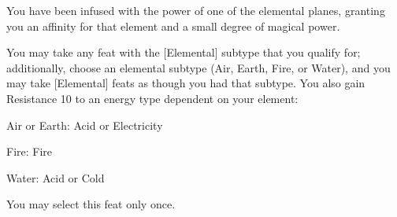 \shortfeat
{You have been infused with the power of one of the elemental planes, granting you an affinity for that element and a small degree of magical power.}
{You may take any feat with the [Elemental] subtype that you qualify for; additionally, choose an elemental subtype (Air, Earth, Fire, or Water), and you may take [Elemental] feats as though you had that subtype. You also gain Resistance 10 to an energy type dependent on your element:

\begin{itemize*}
    \item Air or Earth: Acid or Electricity
    \item Fire: Fire
    \item Water: Acid or Cold
\end{itemize*}
You may select this feat only once.}


